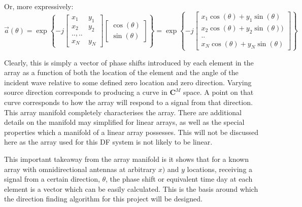 Or, more expressively:
\begin{equation}
\vec{a}(\theta) = \exp \left\{ -j \begin{bmatrix} x_1 & y_1 \\ x_2 & y_2 \\ .., .. \\ x_N & y_N \end{bmatrix} \begin{bmatrix} \cos(\theta) \\ \sin(\theta) \end{bmatrix} \right\}
= \exp \left\{ -j \begin{bmatrix} x_1\cos(\theta) + y_1\sin(\theta) \\ x_2\cos(\theta) + y_2\sin(\theta)) \\ .. \\ x_N\cos(\theta) + y_N\sin(\theta) \end{bmatrix} \right\}
\end{equation}

Clearly, this is simply a vector of phase shifts introduced by each element in the array as a function of both the location of the element and the angle of the incident wave relative to some defined zero location and zero direction. 
Varying source direction corresponds to producing a curve in \(\mathbf{C}^M\) space. 
A point on that curve corresponds to how the array will respond to a signal from that direction.
This array manifold completely characterises the array\cite{dacos1995estimating}. 
There are additional details on the manifold may simplified for linear arrays, as well as the special properties which a manifold of a linear array possesses. 
This will not be discussed here as the array used for this DF system is not likely to be linear. 

This important takeaway from the array manifold is it shows that for a known array with omnidirectional antennas at arbitrary \(x)\) and \(y\) locations, receiving a signal from a certain direction, \(\theta\), the phase shift or equivalent time day at each element is a vector which can be easily calculated. This is the basis around which the direction finding algorithm for this project will be designed. 
